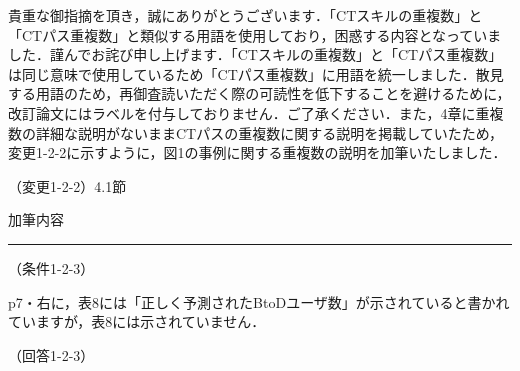 \documentclass{jarticle} %
\def\subsection#1{ \vspace{1pc} {\gt #1} }
\def\nextans{ \vspace{2pc} \hrule }
\begin{document}
貴重な御指摘を頂き，誠にありがとうございます．「CTスキルの重複数」と「CTパス重複数」と類似する用語を使用しており，困惑する内容となっていました．謹んでお詫び申し上げます．「CTスキルの重複数」と「CTパス重複数」は同じ意味で使用しているため「CTパス重複数」に用語を統一しました．散見する用語のため，再御査読いただく際の可読性を低下することを避けるために，改訂論文にはラベルを付与しておりません．ご了承ください．また，4章に重複数の詳細な説明がないままCTパスの重複数に関する説明を掲載していたため，変更1-2-2に示すように，図1の事例に関する重複数の説明を加筆いたしました．

\subsection{（変更1-2-2）4.1節}
\vspace{-0.3cm}
\begin{description}
\item 加筆内容\\
\phantom{　}
\textcolor{red}{}
\end{description}


\newpage
\nextans
\subsection{（条件1-2-3）}

p7・右に，表8には「正しく予測されたBtoDユーザ数」が示されていると書かれていますが，表8には示されていません．

\subsection{（回答1-2-3）}
\end{document}
